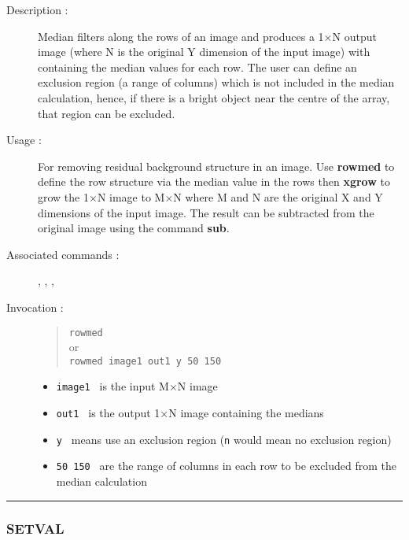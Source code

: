 \begin{description}

\item[Description :] Median filters along the rows of an image and
produces a 1$\times$N output image (where N is the original Y dimension
of the input image) with containing the median values for each row.
The user can define an exclusion region (a range of columns) which is
not included in the median calculation, hence, if there is a bright
object near the centre of the array, that region can be excluded.

\item[Usage :] For removing residual background structure
in an image.  Use {\bf rowmed} to define the row structure via the
median value in the rows then {\bf xgrow} to grow the 1$\times$N image
to M$\times$N where M and N are the original X and Y dimensions of the
input image.  The result can be subtracted from the original image
using the command {\bf sub}.

\item[Associated commands :] {\tt {}},
{\tt {}}, {\tt {}},
{\tt {}}

\item[Invocation :]

\begin{quote}{\tt  rowmed }\\
or \\
{\tt rowmed image1 out1 y 50 150 }
\end{quote}

\begin{itemize}

\item {\tt image1 } is the input M$\times$N image
\item {\tt out1 } is the output 1$\times$N image containing the medians
\item {\tt y } means use an exclusion region ({\tt n} would mean no exclusion
 region)
\item {\tt 50 150 } are the range of columns in each row to be excluded
 from the median calculation
\end{itemize}

\end{description}

\hrule
\subsubsection*{\label{SETVAL}SETVAL}

